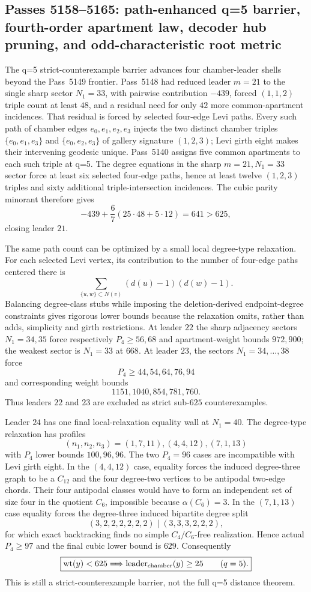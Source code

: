 \ifdefined\WPassFiveOneFiveEightLoaded\else
\gdef\WPassFiveOneFiveEightLoaded{1}
\subsection*{Passes 5158--5165: path-enhanced q=5 barrier, fourth-order apartment law, decoder hub pruning, and odd-characteristic root metric}

The q=5 strict-counterexample barrier advances four chamber-leader shells beyond the Pass~5149 frontier.  Pass~5148 had reduced leader $m=21$ to the single sharp sector $N_1=33$, with pairwise contribution $-439$, forced $(1,1,2)$ triple count at least $48$, and a residual need for only $42$ more common-apartment incidences.  That residual is forced by selected four-edge Levi paths.  Every such path of chamber edges $e_0,e_1,e_2,e_3$ injects the two distinct chamber triples $\{e_0,e_1,e_3\}$ and $\{e_0,e_2,e_3\}$ of gallery signature $(1,2,3)$; Levi girth eight makes their intervening geodesic unique.  Pass~5140 assigns five common apartments to each such triple at q=5.  The degree equations in the sharp $m=21,N_1=33$ sector force at least six selected four-edge paths, hence at least twelve $(1,2,3)$ triples and sixty additional triple-intersection incidences.  The cubic parity minorant therefore gives
\[
 -439+\frac67(25\cdot48+5\cdot12)=641>625,
\]
closing leader $21$.

The same path count can be optimized by a small local degree-type relaxation.  For each selected Levi vertex, its contribution to the number of four-edge paths centered there is
\[
 \sum_{\{u,w\}\subset N(v)}(d(u)-1)(d(w)-1).
\]
Balancing degree-class stubs while imposing the deletion-derived endpoint-degree constraints gives rigorous lower bounds because the relaxation omits, rather than adds, simplicity and girth restrictions.  At leader $22$ the sharp adjacency sectors $N_1=34,35$ force respectively $P_4\ge56,68$ and apartment-weight bounds $972,900$; the weakest sector is $N_1=33$ at $668$.  At leader $23$, the sectors $N_1=34,\ldots,38$ force
\[
 P_4\ge44,54,64,76,94
\]
and corresponding weight bounds
\[
 1151,1040,854,781,760.
\]
Thus leaders $22$ and $23$ are excluded as strict sub-$625$ counterexamples.

Leader $24$ has one final local-relaxation equality wall at $N_1=40$.  The degree-type relaxation has profiles
\[
 (n_1,n_2,n_3)=(1,7,11),(4,4,12),(7,1,13)
\]
with $P_4$ lower bounds $100,96,96$.  The two $P_4=96$ cases are incompatible with Levi girth eight.  In the $(4,4,12)$ case, equality forces the induced degree-three graph to be a $C_{12}$ and the four degree-two vertices to be antipodal two-edge chords.  Their four antipodal classes would have to form an independent set of size four in the quotient $C_6$, impossible because $\alpha(C_6)=3$.  In the $(7,1,13)$ case equality forces the degree-three induced bipartite degree split
\[
 (3,2,2,2,2,2,2)\mid(3,3,3,2,2,2),
\]
for which exact backtracking finds no simple $C_4/C_6$-free realization.  Hence actual $P_4\ge97$ and the final cubic lower bound is $629$.  Consequently
\[
 \boxed{\operatorname{wt}(y)<625\Longrightarrow
        \operatorname{leader}_{\rm chamber}(y)\ge25\qquad(q=5).}
\]
This is still a strict-counterexample barrier, not the full q=5 distance theorem.

